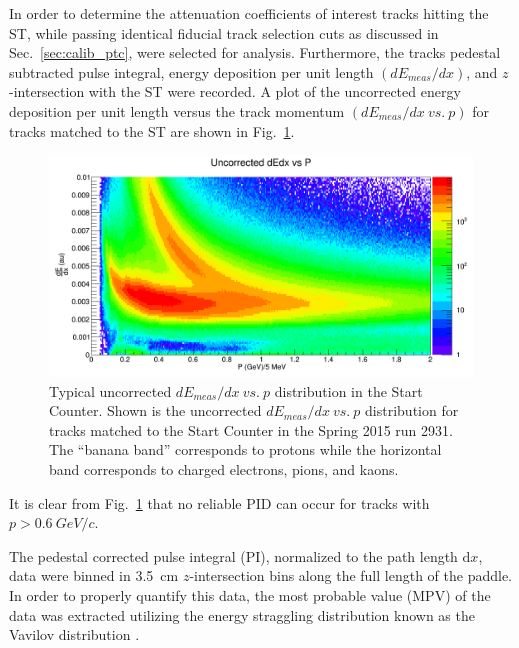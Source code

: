 In order to determine the attenuation coefficients of interest tracks hitting the ST, while passing identical fiducial track selection cuts as discussed in Sec.~\ref{sec:calib_ptc}, were selected for analysis.  Furthermore, the tracks pedestal subtracted pulse integral, energy deposition per unit length $(dE_{meas} / dx)$, and $z$-intersection with the ST were recorded.  A plot of the uncorrected energy deposition per unit length versus the track momentum $(dE_{meas} / dx\ vs.\ p)$ for tracks matched to the ST are shown in Fig.~\ref{fig:dEdx_vs_p_uncorr}.
	\begin{figure}[!htb]
		\centering
		\includegraphics[width=1.0\columnwidth]{calibration/figs/dEdx_vs_p_uncorr}
		\caption{Typical uncorrected $dE_{meas}/dx\ vs.\ p$ distribution in the Start Counter.  Shown is the uncorrected $dE_{meas}/dx\ vs.\ p$ distribution for tracks matched to the Start Counter in the Spring 2015 run 2931. The ``banana band'' corresponds to protons while the horizontal band corresponds to charged electrons, pions, and kaons.}
		\label{fig:dEdx_vs_p_uncorr}
	\end{figure}
It is clear from Fig.~\ref{fig:dEdx_vs_p_uncorr} that no reliable PID can occur for tracks with $p > 0.6\ GeV/c$.

The pedestal corrected pulse integral (PI), normalized to the path length $\mathrm{d}x$, data were binned in 3.5~cm $z$-intersection bins along the full length of the paddle. 
In order to properly quantify this data, the most probable value (MPV) of the data was extracted utilizing the energy straggling distribution known as the Vavilov distribution \cite{vavilov_1957}.

